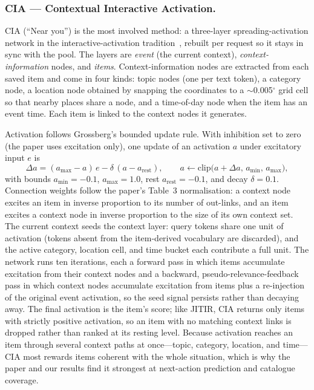 \documentclass[acmlarge]{acmart}
\begin{document}
\subsubsection{CIA --- Contextual Interactive Activation.}
CIA (``Near you'') is the most involved method: a three-layer
spreading-activation network in the interactive-activation
tradition~\cite{mcclelland1981iac}, rebuilt per request so it stays in
sync with the pool. The layers are \emph{event} (the current context),
\emph{context-information} nodes, and \emph{items}. Context-information
nodes are extracted from each saved item and come in four kinds: topic
nodes (one per text token), a category node, a location node obtained by
snapping the coordinates to a $\sim$0.005$^\circ$ grid cell so that nearby
places share a node, and a time-of-day node when the item has an event
time. Each item is linked to the context nodes it generates.

Activation follows Grossberg's bounded update rule. With inhibition set to
zero (the paper uses excitation only), one update of an activation $a$
under excitatory input $e$ is
\begin{equation}
  \Delta a = (a_{\max}-a)\,e - \delta\,(a-a_{\mathrm{rest}}),
  \qquad
  a \leftarrow \mathrm{clip}\big(a+\Delta a,\,a_{\min},\,a_{\max}\big),
\end{equation}
with bounds $a_{\min}=-0.1$, $a_{\max}=1.0$, rest $a_{\mathrm{rest}}=-0.1$,
and decay $\delta=0.1$. Connection weights follow the paper's Table~3
normalisation: a context node excites an item in inverse proportion to its
number of out-links, and an item excites a context node in inverse
proportion to the size of its own context set.
The current context seeds the context layer: query tokens share one unit
of activation (tokens absent from the item-derived vocabulary are
discarded), and the active category, location cell, and time bucket each
contribute a full unit. The network runs ten iterations, each a forward
pass in which items accumulate excitation from their context nodes and a
backward, pseudo-relevance-feedback pass in which context nodes accumulate
excitation from items plus a re-injection of the original event
activation, so the seed signal persists rather than decaying away. The
final activation is the item's score; like JITIR, CIA returns only items
with strictly positive activation, so an item with no matching context
links is dropped rather than ranked at its resting level. Because activation reaches an item through several context paths
at once---topic, category, location, and time---CIA most rewards items
coherent with the whole situation, which is why the paper and our results
find it strongest at next-action prediction and catalogue coverage.
\end{document}
